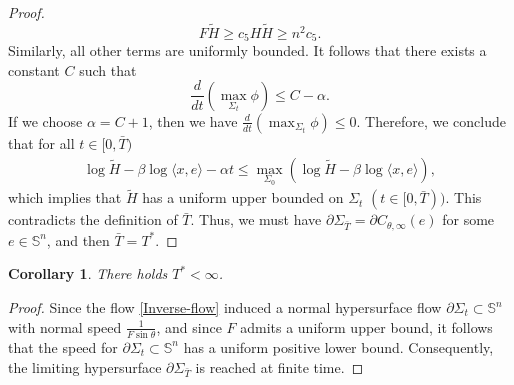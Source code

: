 \documentclass[11pt,reqno]{amsart}
\newtheorem{cor}[thm]{Corollary}
\theoremstyle{definition}
\theoremstyle{remark}
\numberwithin{equation}{section}
\renewcommand{\(}{\left(}
\renewcommand{\)}{\right)}
\renewcommand{\-}{\overline}
\begin{document}
\begin{proof}
\begin{equation}
	F\tilde{H}\geq c_5 H\tilde{H}\geq n^2c_5.
\end{equation}
Similarly, all other terms are uniformly bounded. It follows that there exists a constant $C$ such that
\begin{equation}
\frac{d}{dt}(\max_{\Sigma_t}{\phi})\leq C-\alpha.
\end{equation}
If we choose $\alpha=C+1$, then we have $\frac{d}{dt}(\max_{\Sigma_t}{\phi})\leq0$. Therefore, we conclude that for all $t\in[0, \bar{T})$
\begin{align*} 
	\log\tilde{H}-\beta\log\langle x,e\rangle-\alpha t\leq \max_{\Sigma_0}(	\log\tilde{H}-\beta\log\langle x,e\rangle),
\end{align*}
which implies that $\tilde{H}$ has a uniform upper bounded on $\Sigma_{{t}}$ $(t\in[0,\bar{T}))$. This contradicts the definition of $\bar{T}$. Thus, we must have
 $\partial\Sigma_{\bar{T}}=\partial C_{\theta,\infty}(e)$ for some $e\in\mathbb{S}^n$, and then $\bar{T}=T^{*}$. 
\end{proof}
\begin{cor}
	There holds $T^{* }<\infty$.
\end{cor}
\begin{proof}
	Since the flow \eqref{Inverse-flow} induced a normal hypersurface flow $\partial\Sigma_t\subset\mathbb{S}^n$ with normal speed $\frac{1}{F\sin\theta}$, and since $F$ admits a uniform upper bound, it follows that the speed for $\partial\Sigma_t\subset\mathbb{S}^n$ has a uniform positive lower bound.  Consequently, the limiting hypersurface $\partial\Sigma_{\bar{T}}$ is reached at finite time.
\end{proof}
\end{document}
